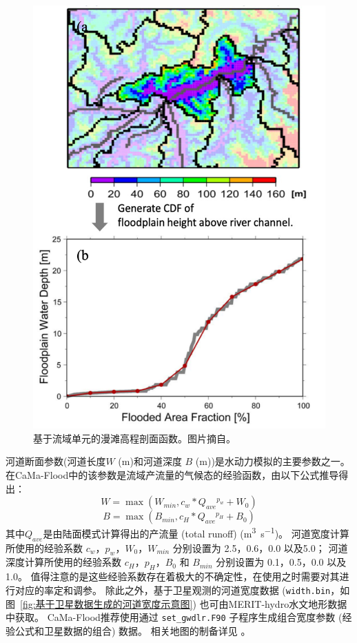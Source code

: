 {
\begin{figure}[htbp]
\centering
\includegraphics{Figures/陆地表面的水分循环/基于流域单元的漫滩高程剖面函数.png}
\caption{基于流域单元的漫滩高程剖面函数。图片摘自\citet{yamazaki2013improving}。  }
\label{fig:基于流域单元的漫滩高程剖面函数}
\end{figure}
}


河道断面参数(河道长度$W$ (m)和河道深度 $B$ (m))是水动力模拟的主要参数之一。在CaMa-Flood中的该参数是流域产流量的气候态的经验函数，由以下公式推导得出：
\begin{equation}
W=\max \left(W_{min}, c_{w} * Q_{ave}{}^{p_{w}}+W_{0}\right)
\end{equation}
\begin{equation}
B=\max \left(B_{min}, c_{H} * Q_{ave}{}^{p_{H}}+B_{0}\right)
\end{equation}
其中$Q_{ave}$是由陆面模式计算得出的产流量 (total runoff) (\unit{m^3.s^{-1}})。
河道宽度计算所使用的经验系数 $c_w$，$p_w$，$W_0$，$W_{min}$ 分别设置为 2.5，0.6，0.0 以及5.0；
河道深度计算所使用的经验系数 $c_H$，$p_H$，$B_0$ 和 $B_{min}$ 分别设置为 0.1，0.5，0.0 以及1.0。
值得注意的是这些经验系数存在着极大的不确定性，在使用之时需要对其进行对应的率定和调参。
除此之外，基于卫星观测的河道宽度数据 (\texttt{width.bin}，如图~\ref{fig:基于卫星数据生成的河道宽度示意图}) 也可由MERIT-hydro水文地形数据中获取。
CaMa-Flood推荐使用通过 \texttt{set\_gwdlr.F90} 子程序生成组合宽度参数 (经验公式和卫星数据的组合) 数据。
相关地图的制备详见 \citet{yamazaki2014regional, yamazaki2014development}。

